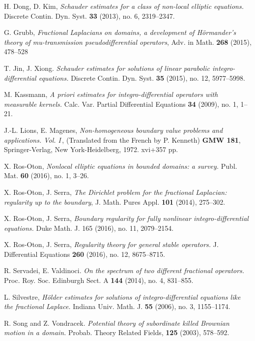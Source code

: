 \documentclass[11pt]{article}
\numberwithin{equation}{section}
\begin{document}
\begin{thebibliography}{00}
 H. Dong, D. Kim, \textit{Schauder estimates for a class of non-local elliptic equations. }Discrete Contin. Dyn. Syst. \textbf{33} (2013), no. 6, 2319--2347.

 G. Grubb, \textit{Fractional Laplacians on domains, a development of H\"ormander's theory of mu-transmission pseudodifferential operators}, Adv. in Math. \textbf{268} (2015), 478--528 %


T. Jin, J. Xiong.
{\it
Schauder estimates for solutions of linear parabolic integro-differential equations.}
Discrete Contin. Dyn. Syst. {\bf 35} (2015), no. 12, 5977--5998.

 M. Kassmann, \textit{A priori estimates for integro-differential operators with measurable kernels. }Calc. Var. Partial Differential Equations \textbf{34} (2009), no. 1, 1--21.


   J.-L. Lions, E. Magenes, \textsl{Non-homogeneous boundary value problems and applications. Vol. I}\,, (Translated from the French by P. Kenneth) \textbf{GMW 181}, Springer-Verlag, New York-Heidelberg, 1972. xvi+357 pp.

 X. Ros-Oton, \textit{Nonlocal elliptic equations in bounded domains: a survey. }Publ. Mat. {\bf 60} (2016), no. 1, 3--26.

 X. Ros-Oton, J. Serra, \textit{The Dirichlet problem for the fractional Laplacian: regularity up to the boundary}, J. Math. Pures Appl. \textbf{101} (2014), 275--302.

 X. Ros-Oton, J. Serra, \textit{Boundary regularity for fully nonlinear integro-differential equations. }Duke Math. J. 165 (2016), no. 11, 2079--2154.

 X. Ros-Oton, J. Serra, \textit{Regularity theory for general stable operators. }J. Differential Equations {\bf 260} (2016), no. 12, 8675--8715.

   {\rm R. Servadei, E. Valdinoci.} \textit{On the spectrum of two different fractional operators. }Proc. Roy. Soc. Edinburgh Sect. A \textbf{144} (2014), no. 4, 831--855.
%

L. Silvestre, \textit{H\"older estimates for solutions of integro-differential equations like the fractional Laplace. }
Indiana Univ. Math. J. \textbf{55} (2006), no. 3, 1155--1174.


 R. Song and Z. Vondracek. \textit{Potential theory of subordinate killed Brownian motion in a domain. 	}Probab. Theory Related Fields, \textbf{125} (2003), 578--592.



\end{thebibliography}
\end{document}
